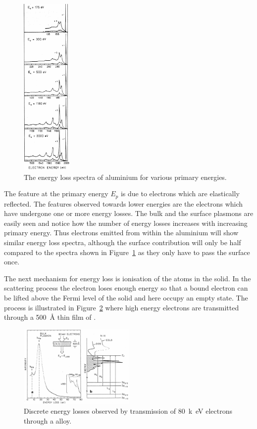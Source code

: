 \begin{figure}[htbp]
\centering
\includegraphics[width=0.22\textwidth]{figures/02_09}
\caption{The energy loss spectra of aluminium for various primary energies.}
\label{fig:plasmon_spectra}
\end{figure}

The feature at the primary energy $E_{p}$ is due to electrons which are elastically reflected. The features observed towards lower energies are the electrons which have undergone one or more energy losses. The bulk and the surface plasmons are easily seen and notice how the number of energy losses increases with increasing primary energy. Thus electrons emitted from within the aluminium will show similar energy loss spectra, although the surface contribution will only be half compared to the spectra shown in Figure~\ref{fig:plasmon_spectra} as they only have to pass the surface once.

The next mechanism for energy loss is ionisation of the atoms in the solid. In the scattering process the electron loses enough energy so that a bound electron can be lifted above the Fermi level of the solid and here occupy an empty state. The process is illustrated in Figure~\ref{fig:discrete_losses} where high energy electrons are transmitted through a \SI{500}{\angstrom} thin film of .

\begin{figure}[htbp]
\centering
\includegraphics[width=0.5\textwidth]{figures/02_10}
\caption{Discrete energy losses observed by transmission of \SI{80}{k\electronvolt} electrons through a  alloy.}
\label{fig:discrete_losses}
\end{figure}

